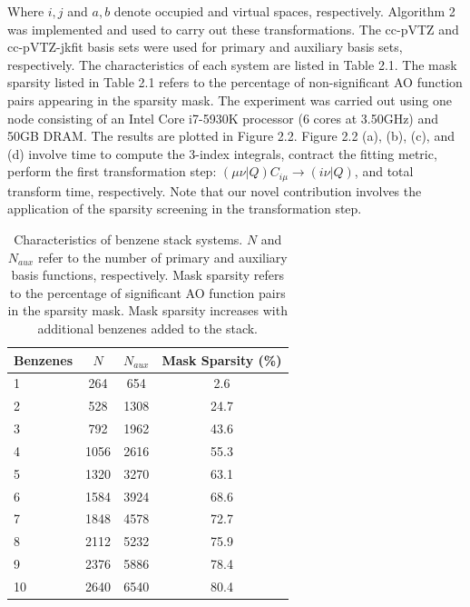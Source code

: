 \noindent Where $i, j$ and $a, b$ denote occupied and virtual spaces, respectively. 
Algorithm 2 was implemented and used to carry out these transformations.
The cc-pVTZ and cc-pVTZ-jkfit basis sets were used for primary 
and auxiliary basis sets, respectively. The characteristics
of each system are listed in Table 2.1. The mask sparsity listed in Table 2.1 refers to the percentage of non-significant AO function pairs appearing in the sparsity mask.
The experiment was carried out using one node consisting of an Intel Core i7-5930K processor 
(6 cores at 3.50GHz) and 50GB DRAM. The results are plotted in Figure 2.2. Figure 2.2 (a), (b), (c), and (d) involve time to compute the 3-index integrals, contract the fitting metric,
perform the first transformation step: $(\mu \nu | Q)C_{i \mu} \rightarrow (i \nu | Q)$,
and total transform time, respectively.
Note that our novel contribution involves the application of the sparsity screening in the transformation step.

\begingroup
\begin{table}[H]
\centering
\renewcommand{\baselinestretch}{1}
\caption{Characteristics of benzene stack systems. $N$ and $N_{aux}$ refer to the number of primary and auxiliary basis functions, respectively.
 Mask sparsity refers to the percentage of significant AO function pairs in the sparsity mask. Mask sparsity increases with additional benzenes added to the stack.}
\begin{tabular}{l ccc}
\multicolumn{1}{l}{\textbf{Benzenes}} &
\multicolumn{1}{c}{\textbf{$N$}} &
\multicolumn{1}{c}{\textbf{$N_{aux}$}} &
\multicolumn{1}{c}{\textbf{Mask Sparsity (\%)}} \\
\hline
1        & 264  & 654       & 2.6              \\ 
2        & 528  & 1308      & 24.7             \\ 
3        & 792  & 1962      & 43.6             \\ 
4        & 1056 & 2616      & 55.3             \\ 
5        & 1320 & 3270      & 63.1             \\ 
6        & 1584 & 3924      & 68.6             \\ 
7        & 1848 & 4578      & 72.7             \\ 
8        & 2112 & 5232      & 75.9             \\ 
9        & 2376 & 5886      & 78.4             \\ 
10       & 2640 & 6540      & 80.4             \\ 
\end{tabular}
\end{table}
\endgroup

